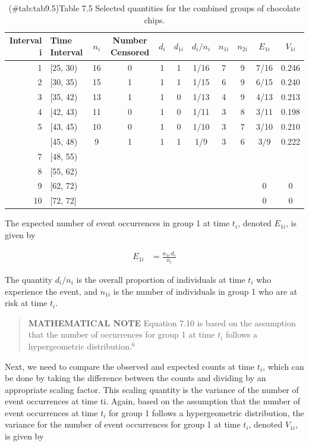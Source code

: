 \documentclass[
]{report}
\begin{document}
\begin{table}[!h]
\centering
\caption{(\#tab:tab9.5)Table 7.5 Selected quantities for the combined groups of chocolate chips.}
\centering
\begin{tabular}[t]{rlccccccccc}
\toprule
Interval i & Time Interval & $n_i$ & Number Censored & $d_i$ & $d_{1i}$ & $d_i/n_i$ & $n_{1i}$ & $n_{2i}$ & $E_{1i}$ & $V_{1i}$\\
\midrule
1 & {}[25, 30) & 16 & 0 & 1 & 1 & 1/16 & 7 & 9 & 7/16 & 0.246\\
2 & {}[30, 35) & 15 & 1 & 1 & 1 & 1/15 & 6 & 9 & 6/15 & 0.240\\
3 & {}[35, 42) & 13 & 1 & 1 & 0 & 1/13 & 4 & 9 & 4/13 & 0.213\\
4 & {}[42, 43) & 11 & 0 & 1 & 0 & 1/11 & 3 & 8 & 3/11 & 0.198\\
5 & {}[43, 45) & 10 & 0 & 1 & 0 & 1/10 & 3 & 7 & 3/10 & 0.210\\
\addlinespace
6 & {}[45, 48) & 9 & 1 & 1 & 1 & 1/9 & 3 & 6 & 3/9 & 0.222\\
7 & {}[48, 55) &  &  &  &  &  &  &  &  & \\
8 & {}[55, 62) &  &  &  &  &  &  &  &  & \\
9 & {}[62, 72) &  &  &  &  &  &  &  & 0 & 0\\
10 & {}[72, 72] &  &  &  &  &  &  &  & 0 & 0\\
\bottomrule
\end{tabular}
\end{table}

The expected number of event occurrences in group 1 at time \(t_i\), denoted \(E_{1i}\), is given by

\begin{align}\label{9.10}
E_{1i} &= \frac{n_{1i}\,d_i}{n_i}
\tag{7.10}
\end{align}

The quantity \(\scriptstyle d_i/n_i\) is the overall proportion of individuals at time \(\scriptstyle t_i\) who experience the event, and \(\scriptstyle n_{1i}\) is the
number of individuals in group 1 who are at risk at time \(\scriptstyle t_i\).

\begin{quote}
\textbf{MATHEMATICAL NOTE} Equation 7.10 is based on the assumption that the number of occurrences for group 1 at time \(t_i\) follows a hypergeometric distribution.\(^6\)
\end{quote}

Next, we need to compare the observed and expected counts at time \(\scriptstyle t_i\), which can be done by taking the difference between the counts and dividing by an appropriate scaling factor. This scaling quantity is the variance of the number of event occurrences at time ti. Again, based on the assumption that the number of event occurrences at time \(\scriptstyle t_i\) for group 1 follows a hypergeometric distribution, the variance for the number of event occurrences for group 1 at time \(\scriptstyle t_i\), denoted \(\scriptstyle V_{1i}\), is given by
\end{document}
